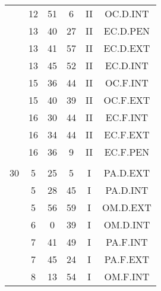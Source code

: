 \documentclass[12pt, a4paper]{article}
\begin{document}
\begin{multicols}{3}
{\begin{tabular}{c c c c c c}
	 	 	 	 & 12 & 51 & 6 & II & OC.D.INT\\%
	 	 	 	 & 13 & 40 & 27 & II & EC.D.PEN\\%
	 	 	 	 & 13 & 41 & 57 & II & EC.D.EXT\\%
	 	 	 	 & 13 & 45 & 52 & II & EC.D.INT\\%
	 	 	 	 & 15 & 36 & 44 & II & OC.F.INT\\%
	 	 	 	 & 15 & 40 & 39 & II & OC.F.EXT\\%
	 	 	 	 & 16 & 30 & 44 & II & EC.F.INT\\%
	 	 	 	 & 16 & 34 & 44 & II & EC.F.EXT\\%
	 	 	 	 & 16 & 36 & 9 & II & EC.F.PEN\\%
	 	 	 	 & & & & & \\%
	 	 	 	30 & 5 & 25 & 5 & I & PA.D.EXT\\%
	 	 	 	 & 5 & 28 & 45 & I & PA.D.INT\\%
	 	 	 	 & 5 & 56 & 59 & I & OM.D.EXT\\%
	 	 	 	 & 6 & 0 & 39 & I & OM.D.INT\\%
	 	 	 	 & 7 & 41 & 49 & I & PA.F.INT\\%
	 	 	 	 & 7 & 45 & 24 & I & PA.F.EXT\\%
	 	 	 	 & 8 & 13 & 54 & I & OM.F.INT\\%
	 	 \end{tabular}
 	}
\end{multicols}
\end{document}

